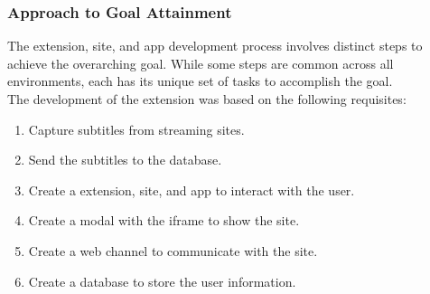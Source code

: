 \documentclass[12pt]{article}
\begin{document}
\subsubsection{Approach to Goal Attainment}
The extension, site, and app development process involves distinct steps to achieve the overarching goal. While some steps are common across all environments, each has its unique set of tasks to accomplish the goal. \\
The development of the extension was based on the following requisites:  
\begin{enumerate}
  \item Capture subtitles from streaming sites.
  \item Send the subtitles to the database.
  \item Create a extension, site, and app to interact with the user.
  \item Create a modal with the iframe to show the site.
  \item Create a web channel to communicate with the site.
  \item Create a database to store the user information.

\end{enumerate}
\end{document}
